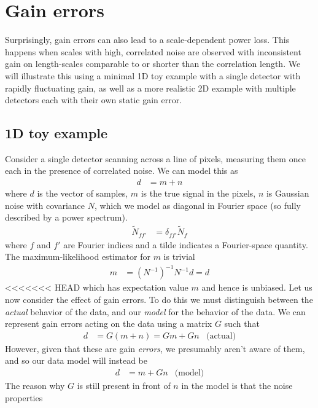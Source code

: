 \documentclass[twocolumn,apj]{aastex63}
\begin{document}
\section{Gain errors}
Surprisingly, gain errors can also lead to a scale-dependent power loss.
This happens when scales with high, correlated noise are observed with
inconsistent gain on length-scales comparable to or shorter than the
correlation length. We will illustrate this using a minimal 1D toy example
with a single detector with rapidly fluctuating gain, as well as a more
realistic 2D example with multiple detectors each with their own static
gain error.

\subsection{1D toy example}
Consider a single detector scanning across a line of pixels, measuring them
once each in the presence of correlated noise. We can model this as
\begin{align}
	d &= m + n
\end{align}
where $d$ is the vector of samples, $m$ is the true signal in the pixels,
$n$ is Gaussian noise with covariance $N$, which we model as diagonal in Fourier
space (so fully described by a power spectrum).
\begin{align}
	\widetilde{N}_{ff'} &= \delta_{ff'} \widetilde{N}_f
\end{align}
where $f$ and $f'$ are Fourier indices and a tilde indicates a Fourier-space quantity.
The maximum-likelihood estimator for $m$ is trivial
\begin{align}
	\hat m &= (N^{-1})^{-1} N^{-1} d = d
\end{align}
<<<<<<< HEAD
which has expectation value $m$ and hence is unbiased.
Let us now consider the effect of gain errors. To do this we must distinguish between
the \emph{actual} behavior of the data, and our \emph{model} for the behavior of the data.
We can represent gain errors acting on the data using a matrix $G$ such that
\begin{align}
	d &= G(m+n) = Gm + Gn & \text{(actual)} \label{eq:gain-true}
\end{align}
However, given that these are gain \emph{errors}, we presumably aren't aware of them,
and so our data model will instead be
\begin{align}
	d &= m + G n & \text{(model)} \label{eq:gain-model}
\end{align}
The reason why $G$ is still present in front of $n$ in the model is that the noise properties
\end{document}
